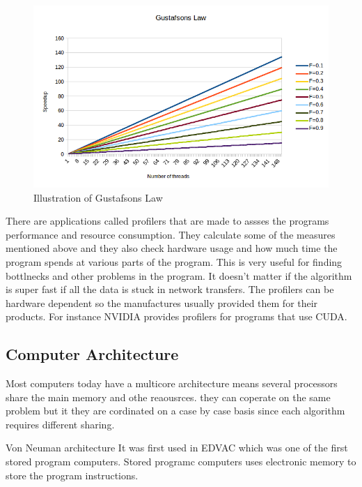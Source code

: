 \documentclass[10pt,a4paper]{article}
\begin{document}
\begin{figure}[h]
    \centering
    \includegraphics[width=13cm]{GustafsonsLaw.png}
    \caption{Illustration of Gustafsons Law}
    \label{fig:GustafsonsLaw}
\end{figure}

There are applications called profilers that are made to assses the programs performance and resource consumption. They calculate some of the measures mentioned above and they also check hardware usage and how much time the program spends at various parts of the program. This is very useful for finding bottlnecks and other problems in the program. It doesn't matter if the algorithm is super fast if all the data is stuck in network transfers. The profilers can be hardware dependent so the manufactures usually provided them for their products. For instance NVIDIA provides profilers for programs that use CUDA.\cite{introduction_hpc_hager, cuda_best_practice}

\clearpage
\subsection{Computer Architecture}
Most computers today have a multicore architecture
means several processors share the main memory and othe reaousrces. they can coperate on the same problem but it they are cordinated on a case by case basis since each algorithm requires different sharing.

Von Neuman architecture
It was first used in EDVAC which was one of the first stored program computers\cite{von1993first}. Stored programc computers uses electronic memory to store the program instructions\cite{computer_arch_2003}.
\end{document}

